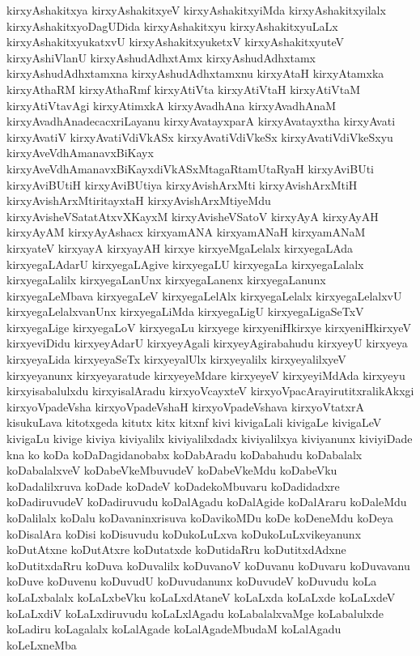 {kirxyAshakitxya
kirxyAshakitxyeV
kirxyAshakitxyiMda
kirxyAshakitxyilalx
kirxyAshakitxyoDagUDida
kirxyAshakitxyu
kirxyAshakitxyuLaLx
kirxyAshakitxyukatxvU
kirxyAshakitxyuketxV
kirxyAshakitxyuteV
kirxyAshiVlanU
kirxyAshudAdhxtAmx
kirxyAshudAdhxtamx
kirxyAshudAdhxtamxna
kirxyAshudAdhxtamxnu
kirxyAtaH
kirxyAtamxka
kirxyAthaRM
kirxyAthaRmf
kirxyAtiVta
kirxyAtiVtaH
kirxyAtiVtaM
kirxyAtiVtavAgi
kirxyAtimxkA
kirxyAvadhAna
kirxyAvadhAnaM
kirxyAvadhAnadecacxriLayanu
kirxyAvatayxparA
kirxyAvatayxtha
kirxyAvati
kirxyAvatiV
kirxyAvatiVdiVkASx
kirxyAvatiVdiVkeSx
kirxyAvatiVdiVkeSxyu
kirxyAveVdhAmanavxBiKayx
kirxyAveVdhAmanavxBiKayxdiVkASxMtagaRtamUtaRyaH
kirxyAviBUti
kirxyAviBUtiH
kirxyAviBUtiya
kirxyAvishArxMti
kirxyAvishArxMtiH
kirxyAvishArxMtiritayxtaH
kirxyAvishArxMtiyeMdu
kirxyAvisheVSatatAtxvXKayxM
kirxyAvisheVSatoV
kirxyAyA
kirxyAyAH
kirxyAyAM
kirxyAyAshacx
kirxyamANA
kirxyamANaH
kirxyamANaM
kirxyateV
kirxyayA
kirxyayAH
kirxye
kirxyeMgaLelalx
kirxyegaLAda
kirxyegaLAdarU
kirxyegaLAgive
kirxyegaLU
kirxyegaLa
kirxyegaLalalx
kirxyegaLalilx
kirxyegaLanUnx
kirxyegaLanenx
kirxyegaLanunx
kirxyegaLeMbava
kirxyegaLeV
kirxyegaLelAlx
kirxyegaLelalx
kirxyegaLelalxvU
kirxyegaLelalxvanUnx
kirxyegaLiMda
kirxyegaLigU
kirxyegaLigaSeTxV
kirxyegaLige
kirxyegaLoV
kirxyegaLu
kirxyege
kirxyeniHkirxye
kirxyeniHkirxyeV
kirxyeviDidu
kirxyeyAdarU
kirxyeyAgali
kirxyeyAgirabahudu
kirxyeyU
kirxyeya
kirxyeyaLida
kirxyeyaSeTx
kirxyeyalUlx
kirxyeyalilx
kirxyeyalilxyeV
kirxyeyanunx
kirxyeyaratude
kirxyeyeMdare
kirxyeyeV
kirxyeyiMdAda
kirxyeyu
kirxyisabalulxdu
kirxyisalAradu
kirxyoVcayxteV
kirxyoVpacArayirutitxralikAkxgi
kirxyoVpadeVsha
kirxyoVpadeVshaH
kirxyoVpadeVshava
kirxyoVtatxrA
kisukuLava
kitotxgeda
kitutx
kitx
kitxnf
kivi
kivigaLali
kivigaLe
kivigaLeV
kivigaLu
kivige
kiviya
kiviyalilx
kiviyalilxdadx
kiviyalilxya
kiviyanunx
kiviyiDade
kna
ko
koDa
koDaDagidanobabx
koDabAradu
koDabahudu
koDabalalx
koDabalalxveV
koDabeVkeMbuvudeV
koDabeVkeMdu
koDabeVku
koDadalilxruva
koDade
koDadeV
koDadekoMbuvaru
koDadidadxre
koDadiruvudeV
koDadiruvudu
koDalAgadu
koDalAgide
koDalAraru
koDaleMdu
koDalilalx
koDalu
koDavaninxrisuva
koDavikoMDu
koDe
koDeneMdu
koDeya
koDisalAra
koDisi
koDisuvudu
koDukoLuLxva
koDukoLuLxvikeyanunx
koDutAtxne
koDutAtxre
koDutatxde
koDutidaRru
koDutitxdAdxne
koDutitxdaRru
koDuva
koDuvalilx
koDuvanoV
koDuvanu
koDuvaru
koDuvavanu
koDuve
koDuvenu
koDuvudU
koDuvudanunx
koDuvudeV
koDuvudu
koLa
koLaLxbalalx
koLaLxbeVku
koLaLxdAtaneV
koLaLxda
koLaLxde
koLaLxdeV
koLaLxdiV
koLaLxdiruvudu
koLaLxlAgadu
koLabalalxvaMge
koLabalulxde
koLadiru
koLagalalx
koLalAgade
koLalAgadeMbudaM
koLalAgadu
koLeLxneMba
}

